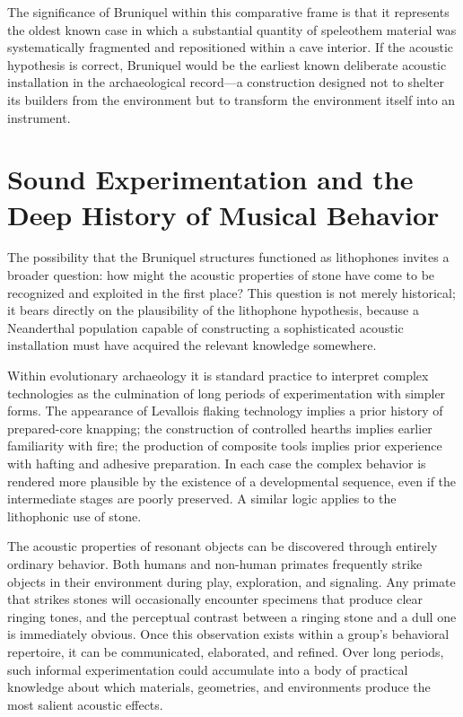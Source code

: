 \documentclass[12pt]{article}
\begin{document}
The significance of Bruniquel within this comparative frame is that it represents the oldest known case in which a substantial quantity of speleothem material was systematically fragmented and repositioned within a cave interior. If the acoustic hypothesis is correct, Bruniquel would be the earliest known deliberate acoustic installation in the archaeological record—a construction designed not to shelter its builders from the environment but to transform the environment itself into an instrument.

\section{Sound Experimentation and the Deep History of Musical Behavior}

The possibility that the Bruniquel structures functioned as lithophones invites a broader question: how might the acoustic properties of stone have come to be recognized and exploited in the first place? This question is not merely historical; it bears directly on the plausibility of the lithophone hypothesis, because a Neanderthal population capable of constructing a sophisticated acoustic installation must have acquired the relevant knowledge somewhere.

Within evolutionary archaeology it is standard practice to interpret complex technologies as the culmination of long periods of experimentation with simpler forms. The appearance of Levallois flaking technology implies a prior history of prepared-core knapping; the construction of controlled hearths implies earlier familiarity with fire; the production of composite tools implies prior experience with hafting and adhesive preparation. In each case the complex behavior is rendered more plausible by the existence of a developmental sequence, even if the intermediate stages are poorly preserved. A similar logic applies to the lithophonic use of stone.

The acoustic properties of resonant objects can be discovered through entirely ordinary behavior. Both humans and non-human primates frequently strike objects in their environment during play, exploration, and signaling. Any primate that strikes stones will occasionally encounter specimens that produce clear ringing tones, and the perceptual contrast between a ringing stone and a dull one is immediately obvious. Once this observation exists within a group's behavioral repertoire, it can be communicated, elaborated, and refined. Over long periods, such informal experimentation could accumulate into a body of practical knowledge about which materials, geometries, and environments produce the most salient acoustic effects.
\end{document}
